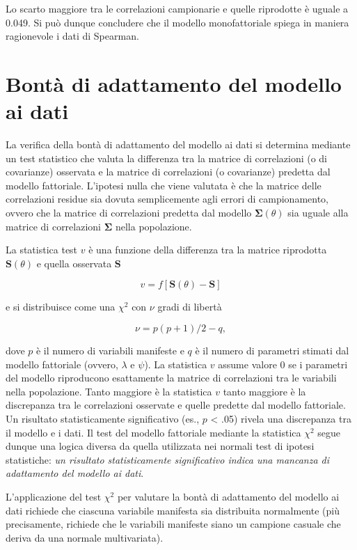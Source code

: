 \documentclass[
  11pt,
]{krantz}
\theoremstyle{definition}
\theoremstyle{definition}
\theoremstyle{definition}
\theoremstyle{definition}
\theoremstyle{remark}
\begin{document}
Lo scarto maggiore tra le correlazioni campionarie e quelle riprodotte è uguale a 0.049. Si può dunque concludere che il modello monofattoriale spiega in maniera ragionevole i dati di Spearman.

\hypertarget{bontuxe0-di-adattamento-del-modello-ai-dati}{%
\section{Bontà di adattamento del modello ai dati}\label{bontuxe0-di-adattamento-del-modello-ai-dati}}

La verifica della bontà di adattamento del modello ai dati si determina mediante un test statistico che valuta la differenza tra la matrice di correlazioni (o di covarianze) osservata e la matrice di correlazioni (o covarianze) predetta dal modello fattoriale. L'ipotesi nulla che viene valutata è che la matrice delle correlazioni residue sia dovuta semplicemente agli errori di campionamento, ovvero che la matrice di correlazioni predetta dal modello \(\boldsymbol{\Sigma}(\theta)\) sia uguale alla matrice di correlazioni \(\boldsymbol{\Sigma}\) nella popolazione.

La statistica test \(v\) è una funzione della differenza tra la matrice riprodotta \(\boldsymbol{S}(\theta)\) e quella osservata \(\boldsymbol{S}\)

\[
v = f\left[\boldsymbol{S}(\theta) - \boldsymbol{S}\right]
\]

e si distribuisce come una \(\chi^2\) con \(\nu\) gradi di libertà

\[
\nu = p(p+1)/ 2 - q,
\]

dove \(p\) è il numero di variabili manifeste e \(q\) è il numero di parametri stimati dal modello fattoriale (ovvero, \(\lambda\) e \(\psi\)). La statistica \(v\) assume valore 0 se i parametri del modello riproducono esattamente la matrice di correlazioni tra le variabili nella popolazione. Tanto maggiore è la statistica \(v\) tanto maggiore è la discrepanza tra le correlazioni osservate e quelle predette dal modello fattoriale. Un risultato statisticamente significativo (es., \(p\) \textless{} .05) rivela una discrepanza tra il modello e i dati. Il test del modello fattoriale mediante la statistica \(\chi^2\) segue dunque una logica diversa da quella utilizzata nei normali test di ipotesi statistiche: \emph{un risultato statisticamente significativo indica una mancanza di adattamento del modello ai dati}.

L'applicazione del test \(\chi^2\) per valutare la bontà di adattamento del modello ai dati richiede che ciascuna variabile manifesta sia distribuita normalmente (più precisamente, richiede che le variabili manifeste siano un campione casuale che deriva da una normale multivariata).
\end{document}
